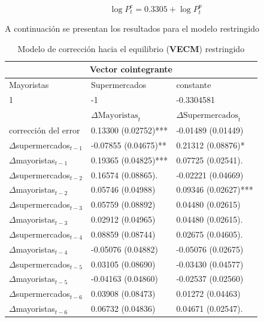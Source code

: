 \begin{equation}
\log P_{t}^{c} = 0.3305+\log P_{t}^{p}
\end{equation}

A continuación se presentan los resultados para el modelo restringido 


\begin{table}[!htpb]
\centering
\begin{threeparttable}
\caption{Modelo de corrección hacia el equilibrio (\textbf{VECM}) restringido \label{vecm_rest}}
\begin{tabular}{@{}lll@{}}
\toprule
\multicolumn{3}{c}{Vector cointegrante} \\
\midrule 
Mayoristas & Supermercados & constante \\ 
1             & -1 & -0.3304581 \\
\midrule
 & $\Delta \text{Mayoristas}_{t} $ & $\Delta \text{Supermercados}_{t}$ \\ 
 \midrule 
 $\text{corrección del error}$ &  0.13300 (0.02752)***    & -0.01489 (0.01449)  \\     
$\Delta$supermercados$_{t-1} $ & -0.07855 (0.04675)**  &  0.21312 (0.08876)*    \\   
$\Delta$mayoristas$_{t-1}    $ &    0.19365 (0.04825)*** &   0.07725 (0.02541).     \\  
$\Delta$supermercados$_{t-2} $ & 0.16574 (0.08865).    &  -0.02221 (0.04669)   \\   
$\Delta$mayoristas$_{t-2}    $ &  0.05746 (0.04988) & 0.09346 (0.02627)***   \\     
$\Delta$supermercados$_{t-3} $ &  0.05759 (0.08892)    &  0.04480 (0.02615)  \\
$\Delta$mayoristas$_{t-3}    $ &  0.02912 (0.04965)   & 0.04480 (0.02615).     \\   
$\Delta$supermercados$_{t-4} $ &  0.08859 (0.08744)   & 0.02675 (0.04605).   \\     
$\Delta$mayoristas$_{t-4}    $ & -0.05076 (0.04882)    &  -0.05076 (0.02675)  \\   
$\Delta$supermercados$_{t-5} $ & 0.03105 (0.08690)    & -0.03430 (0.04577)   \\     
$\Delta$mayoristas$_{t-5}    $ & -0.04163 (0.04860)    &  -0.02537 (0.02560)  \\   
$\Delta$supermercados$_{t-6} $ &  0.03908 (0.08473)    &  0.01272 (0.04463)  \\     
$\Delta$mayoristas$_{t-6}    $ &  0.06732 (0.04836)   & 0.04671 (0.02547).   \\     

\end{tabular}
\end{threeparttable}
\end{table}
